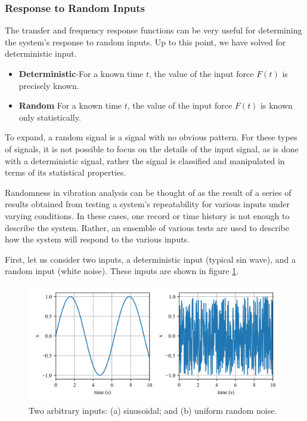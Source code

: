 \documentclass[12pt,letter]{article}
\begin{document}
\subsubsection{Response to Random Inputs}
The transfer and frequency response functions can be very useful for determining the system's response to random inputs. Up to this point, we have solved for deterministic input. 

\begin{itemize}
\item \textbf{Deterministic}-For a known time $t$, the value of the input force $F(t)$ is precisely known. 
\item \textbf{Random} For a known time $t$, the value of the input force $F(t)$ is known only statistically. 
\end{itemize}

To expand, a random signal is a signal with no obvious pattern. For these types of signals, it is not possible to focus on the details of the input signal, as is done with a deterministic signal, rather the signal is classified and manipulated in terms of its statistical properties. 

Randomness in vibration analysis can be thought of as the result of a series of results obtained from testing a system's repeatability for various inputs under varying conditions. In these cases, one record or time history is not enough to describe the system. Rather, an ensemble of various tests are used to describe how the system will respond to the various inputs. 

First, let us consider two inputs, a deterministic input (typical sin wave), and a random input (white noise). These inputs are shown in figure \ref{fig:Response_to_random_input_inputs}. 

\begin{figure}[H]
	\centering
	\includegraphics[width=1\textwidth]{../figures/Response_to_random_input_inputs.png}
	\caption{Two arbitrary inputs: (a) sinusoidal; and (b) uniform random noise.}
	\label{fig:Response_to_random_input_inputs}
\end{figure}
\end{document}
